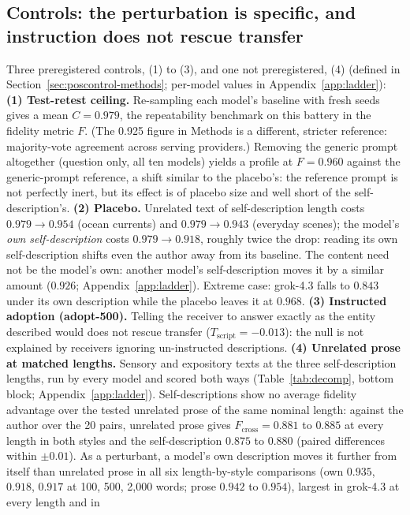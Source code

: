 \documentclass[11pt]{article}
\newcommand{\Fcross}{F_{\mathrm{cross}}}
\newcommand{\Tscript}{T_{\mathrm{script}}}
\begin{document}
\subsection{Controls: the perturbation is specific, and instruction does not
rescue transfer}
\label{sec:controls}
Three preregistered controls, (1) to (3), and one not preregistered, (4)
(defined in Section~\ref{sec:poscontrol-methods}; per-model values in
Appendix~\ref{app:ladder}):
\textbf{(1) Test-retest ceiling.} Re-sampling each model's baseline with fresh
seeds gives a mean $C=0.979$, the repeatability benchmark on this battery in the fidelity
metric $F$. (The 0.925 figure in Methods is a different, stricter reference:
majority-vote agreement across serving providers.) Removing the generic
prompt altogether (question only, all ten models) yields a profile at
$F=0.960$ against the generic-prompt reference, a shift similar to the
placebo's: the reference prompt is not perfectly inert, but its effect is of
placebo size and well short of the self-description's.
\textbf{(2) Placebo.} Unrelated text of self-description length costs
$0.979 \to 0.954$ (ocean currents) and $0.979 \to 0.943$ (everyday scenes);
the model's \emph{own self-description} costs $0.979 \to 0.918$, roughly
twice the drop: reading its own self-description shifts even the author
away from its baseline. The content need not be the model's own: another
model's self-description moves it by a similar amount ($0.926$;
Appendix~\ref{app:ladder}). Extreme case: grok-4.3 falls to $0.843$ under
its own description while the placebo leaves it at $0.968$.
\textbf{(3) Instructed adoption (adopt-500).} Telling the receiver to answer
exactly as the entity described would does not rescue transfer
($\Tscript=-0.013$): the null is not explained by receivers ignoring
un-instructed descriptions.
\textbf{(4) Unrelated prose at matched lengths.} Sensory and expository
texts at the three self-description lengths, run by every model and scored
both ways (Table~\ref{tab:decomp}, bottom block; Appendix~\ref{app:ladder}).
Self-descriptions show no average fidelity advantage over the tested unrelated
prose of the same nominal length: against the author over the 20 pairs,
unrelated prose gives $\Fcross = 0.881$ to $0.885$ at every length in both
styles and the self-description $0.875$ to $0.880$ (paired differences
within $\pm 0.01$). As a perturbant, a model's own description moves it
further from itself than unrelated prose in all six length-by-style
comparisons (own $0.935$, $0.918$, $0.917$ at 100, 500, 2{,}000 words;
prose $0.942$ to $0.954$), largest in grok-4.3 at every length and in
\end{document}
